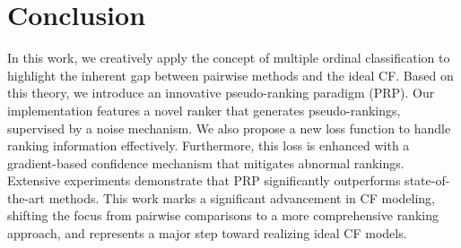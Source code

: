 \section{Conclusion}
In this work, we creatively apply the concept of multiple ordinal classification to highlight the inherent gap between pairwise methods and the ideal CF. Based on this theory, we introduce an innovative pseudo-ranking paradigm (PRP). Our implementation features a novel ranker that generates pseudo-rankings, supervised by a noise mechanism. We also propose a new loss function to handle ranking information effectively. Furthermore, this loss is enhanced with a gradient-based confidence mechanism that mitigates abnormal rankings. Extensive experiments demonstrate that PRP significantly outperforms state-of-the-art methods. This work marks a significant advancement in CF modeling, shifting the focus from pairwise comparisons to a more comprehensive ranking approach, and represents a major step toward realizing ideal CF models.

